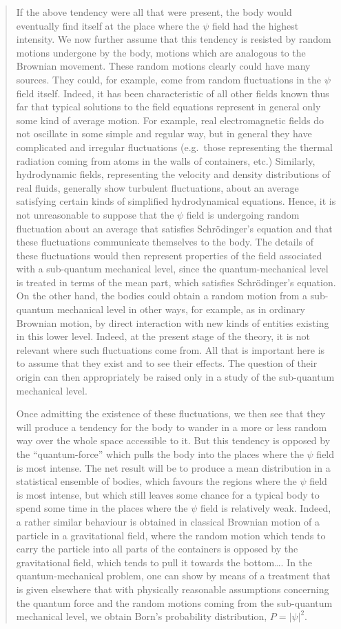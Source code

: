 \documentclass[11pt]{memoir}
\begin{document}
\begin{quote}
If the above tendency were all that were present, the body would
eventually find itself at the place where the $\psi$ field had the
highest intensity. We now further assume that this tendency is resisted
by random motions undergone by the body, motions which are analogous to
the Brownian movement. These random motions clearly could have many
sources. They could, for example, come from random fluctuations in the
$\psi$ field itself. Indeed, it has been characteristic of all other
fields known thus far that typical solutions to the field equations
represent in general only some kind of average motion. For example, real
electromagnetic fields do not oscillate in some simple and regular way,
but in general they have complicated and irregular fluctuations (e.g.\ 
those representing the thermal radiation coming from atoms in the walls
of containers, etc.) Similarly, hydrodynamic fields, representing the
velocity and density distributions of real fluids, generally show
turbulent fluctuations, about an average satisfying certain kinds of
simplified hydrodynamical equations. Hence, it is not unreasonable to
suppose that the $\psi$ field is undergoing random fluctuation about
an average that satisfies Schrödinger's equation and that these
fluctuations communicate themselves to the body. The details of these
fluctuations would then represent properties of the field associated
with a sub-quantum mechanical level, since the quantum-mechanical level
is treated in terms of the mean part, which satisfies Schrödinger's
equation. On the other hand, the bodies could obtain a random motion
from a sub-quantum mechanical level in other ways, for example, as in
ordinary Brownian motion, by direct interaction with new kinds of
entities existing in this lower level. Indeed, at the present stage of
the theory, it is not relevant where such fluctuations come from. All
that is important here is to assume that they exist and to see their
effects. The question of their origin can then appropriately be raised
only in a study of the sub-quantum mechanical level.

Once admitting the existence of these fluctuations, we then see that
they will produce a tendency for the body to wander in a more or less
random way over the whole space accessible to it. But this tendency is
opposed by the ``quantum-force'' which pulls the body into the places
where the $\psi$ field is most intense. The net result will be to
produce a mean distribution in a statistical ensemble of bodies, which
favours the regions where the $\psi$ field is most intense, but which still
leaves some chance for a typical body to spend some time in the places
where the $\psi$ field is relatively weak. Indeed, a rather similar behaviour
is obtained in classical Brownian motion of a particle in a
gravitational field, where the random motion which tends to carry the
particle into all parts of the containers is opposed by the
gravitational field, which tends to pull it towards the bottom\ldots. In
the quantum-mechanical problem, one can show by means of a treatment
that is given elsewhere that with physically reasonable assumptions
concerning the quantum force and the random motions coming from the
sub-quantum mechanical level, we obtain Born's probability distribution,
$P = |\psi|^2$.


\end{quote}
\end{document}

